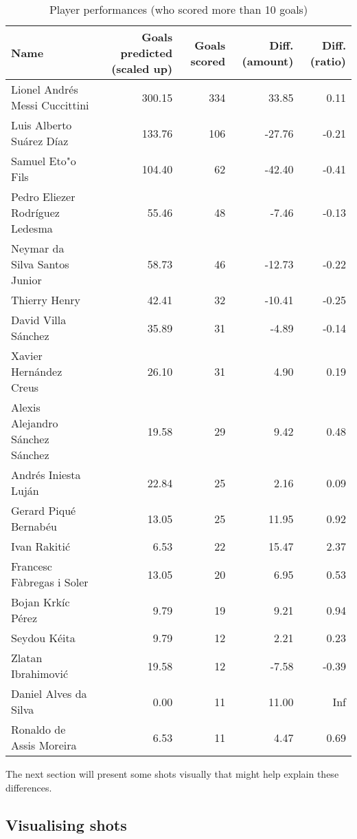 \documentclass[]{article}
\begin{document}
\begin{table}

\caption{\label{tab:unnamed-chunk-8}Player performances (who scored more than 10 goals)}
\centering
\begin{tabular}[t]{l|r|r|r|r}
\hline
Name & Goals predicted (scaled up) & Goals scored & Diff. (amount) & Diff. (ratio)\\
\hline
Lionel Andrés Messi Cuccittini & 300.15 & 334 & 33.85 & 0.11\\
\hline
Luis Alberto Suárez Díaz & 133.76 & 106 & -27.76 & -0.21\\
\hline
Samuel Eto"o Fils & 104.40 & 62 & -42.40 & -0.41\\
\hline
Pedro Eliezer Rodríguez Ledesma & 55.46 & 48 & -7.46 & -0.13\\
\hline
Neymar da Silva Santos Junior & 58.73 & 46 & -12.73 & -0.22\\
\hline
Thierry Henry & 42.41 & 32 & -10.41 & -0.25\\
\hline
David Villa Sánchez & 35.89 & 31 & -4.89 & -0.14\\
\hline
Xavier Hernández Creus & 26.10 & 31 & 4.90 & 0.19\\
\hline
Alexis Alejandro Sánchez Sánchez & 19.58 & 29 & 9.42 & 0.48\\
\hline
Andrés Iniesta Luján & 22.84 & 25 & 2.16 & 0.09\\
\hline
Gerard Piqué Bernabéu & 13.05 & 25 & 11.95 & 0.92\\
\hline
Ivan Rakitić & 6.53 & 22 & 15.47 & 2.37\\
\hline
Francesc Fàbregas i Soler & 13.05 & 20 & 6.95 & 0.53\\
\hline
Bojan Krkíc Pérez & 9.79 & 19 & 9.21 & 0.94\\
\hline
Seydou Kéita & 9.79 & 12 & 2.21 & 0.23\\
\hline
Zlatan Ibrahimović & 19.58 & 12 & -7.58 & -0.39\\
\hline
Daniel Alves da Silva & 0.00 & 11 & 11.00 & Inf\\
\hline
Ronaldo de Assis Moreira & 6.53 & 11 & 4.47 & 0.69\\
\hline
\end{tabular}
\end{table}

The next section will present some shots visually that might help
explain these differences.

\hypertarget{visualising-shots}{%
\subsection{Visualising shots}\label{visualising-shots}}
\end{document}
